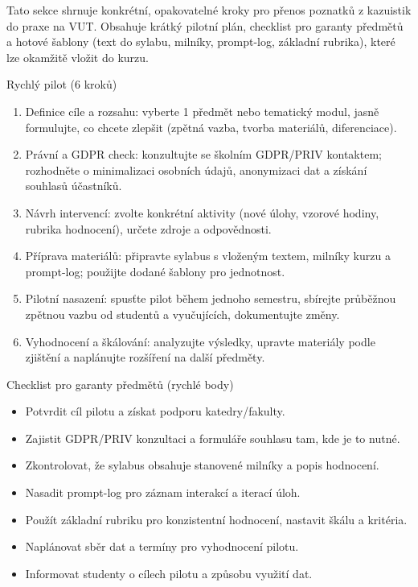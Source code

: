 \documentclass{report}%
\begin{document}
%
Tato sekce shrnuje konkrétní, opakovatelné kroky pro přenos poznatků z kazuistik do praxe na VUT. Obsahuje krátký pilotní plán, checklist pro garanty předmětů a hotové šablony (text do sylabu, milníky, prompt-log, základní rubrika), které lze okamžitě vložit do kurzu.

\bigskip

Rychlý pilot (6 kroků)
\begin{enumerate}
  \item Definice cíle a rozsahu: vyberte 1 předmět nebo tematický modul, jasně formulujte, co chcete zlepšit (zpětná vazba, tvorba materiálů, diferenciace).
  \item Právní a GDPR check: konzultujte se školním GDPR/PRIV kontaktem; rozhodněte o minimalizaci osobních údajů, anonymizaci dat a získání souhlasů účastníků.
  \item Návrh intervencí: zvolte konkrétní aktivity (nové úlohy, vzorové hodiny, rubrika hodnocení), určete zdroje a odpovědnosti.
  \item Příprava materiálů: připravte sylabus s vloženým textem, milníky kurzu a prompt-log; použijte dodané šablony pro jednotnost.
  \item Pilotní nasazení: spusťte pilot během jednoho semestru, sbírejte průběžnou zpětnou vazbu od studentů a vyučujících, dokumentujte změny.
  \item Vyhodnocení a škálování: analyzujte výsledky, upravte materiály podle zjištění a naplánujte rozšíření na další předměty.
\end{enumerate}

\bigskip

Checklist pro garanty předmětů (rychlé body)
\begin{itemize}
  \item Potvrdit cíl pilotu a získat podporu katedry/fakulty.
  \item Zajistit GDPR/PRIV konzultaci a formuláře souhlasu tam, kde je to nutné.
  \item Zkontrolovat, že sylabus obsahuje stanovené milníky a popis hodnocení.
  \item Nasadit prompt-log pro záznam interakcí a iterací úloh.
  \item Použít základní rubriku pro konzistentní hodnocení, nastavit škálu a kritéria.
  \item Naplánovat sběr dat a termíny pro vyhodnocení pilotu.
  \item Informovat studenty o cílech pilotu a způsobu využití dat.
\end{itemize}
\end{document}
